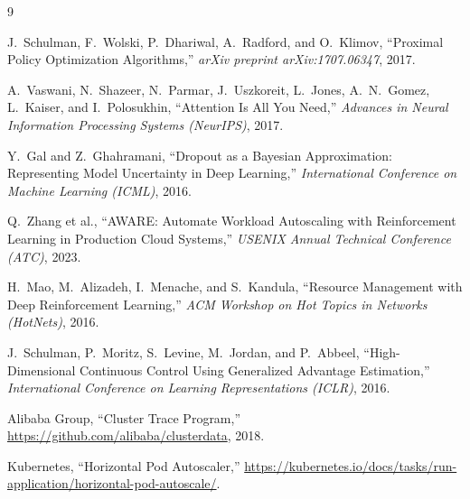 \documentclass[12pt,a4paper]{article}
\begin{document}
\begin{thebibliography}{9}

J.~Schulman, F.~Wolski, P.~Dhariwal, A.~Radford, and O.~Klimov,
``Proximal Policy Optimization Algorithms,''
\textit{arXiv preprint arXiv:1707.06347}, 2017.

A.~Vaswani, N.~Shazeer, N.~Parmar, J.~Uszkoreit, L.~Jones, A.~N.~Gomez,
L.~Kaiser, and I.~Polosukhin,
``Attention Is All You Need,''
\textit{Advances in Neural Information Processing Systems (NeurIPS)}, 2017.

Y.~Gal and Z.~Ghahramani,
``Dropout as a Bayesian Approximation: Representing Model Uncertainty in
Deep Learning,''
\textit{International Conference on Machine Learning (ICML)}, 2016.

Q.~Zhang et al.,
``AWARE: Automate Workload Autoscaling with Reinforcement Learning in
Production Cloud Systems,''
\textit{USENIX Annual Technical Conference (ATC)}, 2023.

H.~Mao, M.~Alizadeh, I.~Menache, and S.~Kandula,
``Resource Management with Deep Reinforcement Learning,''
\textit{ACM Workshop on Hot Topics in Networks (HotNets)}, 2016.

J.~Schulman, P.~Moritz, S.~Levine, M.~Jordan, and P.~Abbeel,
``High-Dimensional Continuous Control Using Generalized Advantage Estimation,''
\textit{International Conference on Learning Representations (ICLR)}, 2016.

Alibaba Group,
``Cluster Trace Program,''
\url{https://github.com/alibaba/clusterdata}, 2018.

Kubernetes,
``Horizontal Pod Autoscaler,''
\url{https://kubernetes.io/docs/tasks/run-application/horizontal-pod-autoscale/}.

\end{thebibliography}
\end{document}
